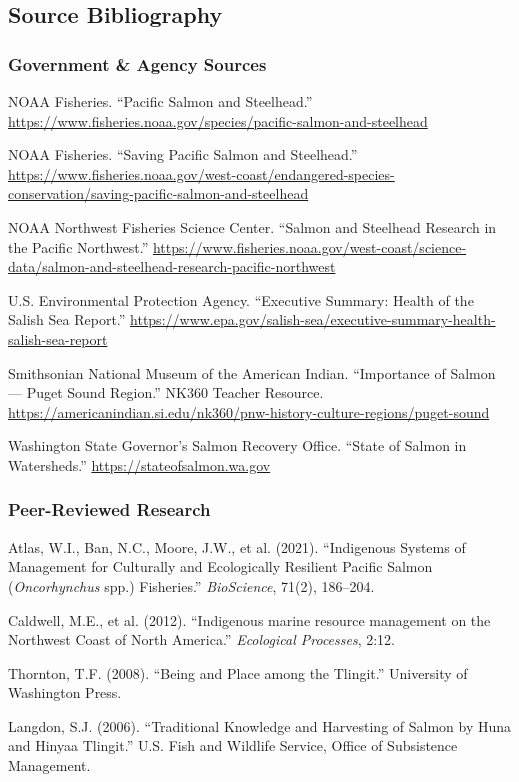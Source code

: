 \documentclass[11pt,letterpaper]{article}
\begin{document}
\subsection{Source Bibliography}

\subsubsection{Government \& Agency Sources}

NOAA Fisheries. ``Pacific Salmon and Steelhead.'' \url{https://www.fisheries.noaa.gov/species/pacific-salmon-and-steelhead}

NOAA Fisheries. ``Saving Pacific Salmon and Steelhead.'' \url{https://www.fisheries.noaa.gov/west-coast/endangered-species-conservation/saving-pacific-salmon-and-steelhead}

NOAA Northwest Fisheries Science Center. ``Salmon and Steelhead Research in the Pacific Northwest.'' \url{https://www.fisheries.noaa.gov/west-coast/science-data/salmon-and-steelhead-research-pacific-northwest}

U.S. Environmental Protection Agency. ``Executive Summary: Health of the Salish Sea Report.'' \url{https://www.epa.gov/salish-sea/executive-summary-health-salish-sea-report}

Smithsonian National Museum of the American Indian. ``Importance of Salmon --- Puget Sound Region.'' NK360 Teacher Resource. \url{https://americanindian.si.edu/nk360/pnw-history-culture-regions/puget-sound}

Washington State Governor's Salmon Recovery Office. ``State of Salmon in Watersheds.'' \url{https://stateofsalmon.wa.gov}

\subsubsection{Peer-Reviewed Research}

Atlas, W.I., Ban, N.C., Moore, J.W., et al. (2021). ``Indigenous Systems of Management for Culturally and Ecologically Resilient Pacific Salmon (\textit{Oncorhynchus} spp.) Fisheries.'' \textit{BioScience}, 71(2), 186--204.

Caldwell, M.E., et al. (2012). ``Indigenous marine resource management on the Northwest Coast of North America.'' \textit{Ecological Processes}, 2:12.

Thornton, T.F. (2008). ``Being and Place among the Tlingit.'' University of Washington Press.

Langdon, S.J. (2006). ``Traditional Knowledge and Harvesting of Salmon by Huna and Hinyaa Tlingit.'' U.S. Fish and Wildlife Service, Office of Subsistence Management.
\end{document}
